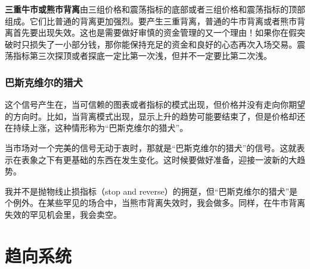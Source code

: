 \textbf{三重牛市或熊市背离}由三组价格和震荡指标的底部或者三组价格和震荡指标的顶部组成。它们比普通的背离更加强烈。要产生三重背离，普通的牛市背离或者熊市背离首先要出现失效。这也是需要做好审慎的资金管理的又一个理由！如果你在假突破时只损失了一小部分钱，那你能保持充足的资金和良好的心态再次入场交易。震荡指标第三次探顶或者探底一定比第一次浅，但并不一定要比第二次浅。
\subsubsection*{巴斯克维尔的猎犬}
这个信号产生在，当可信赖的图表或者指标的模式出现，但价格并没有走向你期望的方向时。比如，当背离模式出现，显示上升的趋势可能要结束了，但是价格却还在持续上涨，这种情形称为“巴斯克维尔的猎犬”。

当市场对一个完美的信号无动于衷时，那就是“巴斯克维尔的猎犬”的信号。这就表示在表象之下有更基础的东西在发生变化。这时候要做好准备，迎接一波新的大趋势。

我并不是抛物线止损指标（stop and reverse）的拥趸，但“巴斯克维尔的猎犬”是个例外。在某些罕见的场合中，当熊市背离失效时，我会做多。同样，在牛市背离失效的罕见机会里，我会卖空。
\section{趋向系统}
